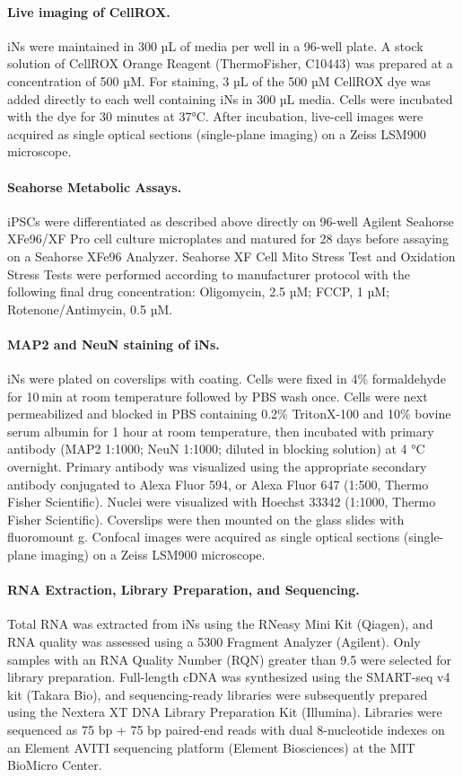 \paragraph{Live imaging of CellROX.}
iNs were maintained in 300 µL of media per well in a 96-well plate. A stock solution of CellROX Orange Reagent (ThermoFisher, C10443) was prepared at a concentration of 500 µM. For staining, 3 µL of the 500 µM CellROX dye was added directly to each well containing iNs in 300 µL media. Cells were incubated with the dye for 30 minutes at 37°C. After incubation, live-cell images were acquired as single optical sections (single-plane imaging) on a Zeiss LSM900 microscope.

\paragraph{Seahorse Metabolic Assays.}
iPSCs were differentiated as described above directly on 96-well Agilent Seahorse XFe96/XF Pro cell culture microplates and matured for 28 days before assaying on a Seahorse XFe96 Analyzer. Seahorse XF Cell Mito Stress Test and Oxidation Stress Tests were performed according to manufacturer protocol with the following final drug concentration: Oligomycin, 2.5 µM; FCCP, 1 µM; Rotenone/Antimycin, 0.5 µM. 

\paragraph{MAP2 and NeuN staining of iNs.}
iNs were plated on coverslips with coating. Cells were fixed in 4\% formaldehyde for 10 min at room temperature followed by PBS wash once. Cells were next permeabilized and blocked in PBS containing 0.2\% TritonX-100 and 10\% bovine serum albumin for 1 hour at room temperature, then incubated with primary antibody (MAP2 1:1000; NeuN 1:1000; diluted in blocking solution) at 4 °C overnight. Primary antibody was visualized using the appropriate secondary antibody conjugated to Alexa Fluor 594, or Alexa Fluor 647 (1:500, Thermo Fisher Scientific). Nuclei were visualized with Hoechst 33342 (1:1000, Thermo Fisher Scientific). Coverslips were then mounted on the glass slides with fluoromount g. Confocal images were acquired as single optical sections (single-plane imaging) on a Zeiss LSM900 microscope.

\paragraph{RNA Extraction, Library Preparation, and Sequencing.}
Total RNA was extracted from iNs using the RNeasy Mini Kit (Qiagen), and RNA quality was assessed using a 5300 Fragment Analyzer (Agilent). Only samples with an RNA Quality Number (RQN) greater than 9.5 were selected for library preparation. Full-length cDNA was synthesized using the SMART-seq v4 kit (Takara Bio), and sequencing-ready libraries were subsequently prepared using the Nextera XT DNA Library Preparation Kit (Illumina). Libraries were sequenced as 75 bp + 75 bp paired-end reads with dual 8-nucleotide indexes on an Element AVITI sequencing platform (Element Biosciences) at the MIT BioMicro Center. 